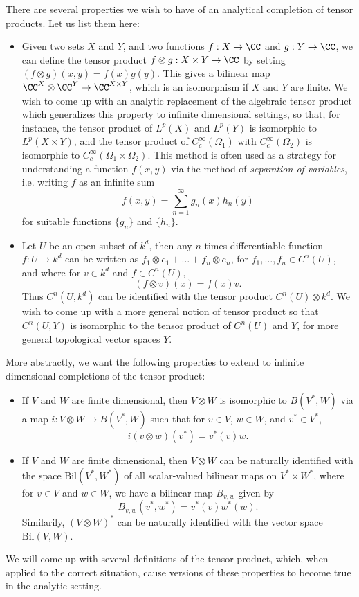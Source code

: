 There are several properties we wish to have of an analytical completion of tensor products. Let us list them here:
%
\begin{itemize}
    \item Given two sets $X$ and $Y$, and two functions $f: X \to \CC$ and $g: Y \to \CC$, we can define the tensor product $f \otimes g: X \times Y \to \CC$ by setting $(f \otimes g)(x,y) = f(x) g(y)$. This gives a bilinear map $\CC^X \otimes \CC^Y \to \CC^{X \times Y}$, which is an isomorphism if $X$ and $Y$ are finite. We wish to come up with an analytic replacement of the algebraic tensor product which generalizes this property to infinite dimensional settings, so that, for instance, the tensor product of $L^p(X)$ and $L^p(Y)$ is isomorphic to $L^p(X \times Y)$, and the tensor product of $C_c^\infty(\Omega_1)$ with $C_c^\infty(\Omega_2)$ is isomorphic to $C_c^\infty(\Omega_1 \times \Omega_2)$. This method is often used as a strategy for understanding a function $f(x,y)$ via the method of \emph{separation of variables}, i.e. writing $f$ as an infinite sum
    \[ f(x,y) = \sum_{n = 1}^\infty g_n(x) h_n(y) \]
    for suitable functions $\{ g_n \}$ and $\{ h_n \}$.

    \item Let $U$ be an open subset of $k^d$, then any $n$-times differentiable function $f: U \to k^d$ can be written as $f_1 \otimes e_1 + \dots + f_n \otimes e_n$, for $f_1,\dots,f_n \in C^n(U)$, and where for $v \in k^d$ and $f \in C^n(U)$,
    \[ (f \otimes v)(x) = f(x) v. \]
    Thus $C^n(U,k^d)$ can be identified with the tensor product $C^n(U) \otimes k^d$. We wish to come up with a more general notion of tensor product so that $C^n(U,Y)$ is isomorphic to the tensor product of $C^n(U)$ and $Y$, for more general topological vector spaces $Y$.
\end{itemize}
%
More abstractly, we want the following properties to extend to infinite dimensional completions of the tensor product:
%
\begin{itemize}
    \item If $V$ and $W$ are finite dimensional, then $V \otimes W$ is isomorphic to $B(V^*,W)$ via a map $i: V \otimes W \to B(V^*,W)$ such that for $v \in V$, $w \in W$, and $v^* \in V^*$,
    \[ i(v \otimes w)(v^*) = v^*(v) w. \]

    \item If $V$ and $W$ are finite dimensional, then $V \otimes W$ can be naturally identified with the space $\text{Bil}(V^*,W^*)$ of all scalar-valued bilinear maps on $V^* \times W^*$, where for $v \in V$ and $w \in W$, we have a bilinear map $B_{v,w}$ given by
    \[ B_{v,w}(v^*,w^*) = v^*(v) w^*(w). \]
    Similarily, $(V \otimes W)^*$ can be naturally identified with the vector space $\text{Bil}(V,W)$.
\end{itemize}
%
We will come up with several definitions of the tensor product, which, when applied to the correct situation, cause versions of these properties to become true in the analytic setting.

